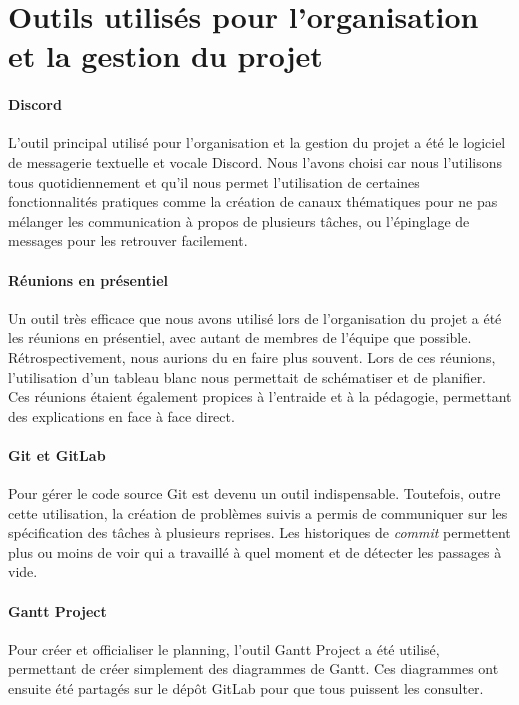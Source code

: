 \section{Outils utilisés pour l'organisation et la gestion du projet}

\paragraph{Discord} L'outil principal utilisé pour
l'organisation et la gestion du projet a été le logiciel de
messagerie textuelle et vocale Discord. Nous l'avons choisi
car nous l'utilisons tous quotidiennement et qu'il nous
permet l'utilisation de certaines fonctionnalités pratiques
comme la création de canaux thématiques pour ne pas mélanger
les communication à propos de plusieurs tâches, ou l'épinglage
de messages pour les retrouver facilement.

\paragraph{Réunions en présentiel} Un outil très efficace que
nous avons utilisé lors de l'organisation du projet a été les
réunions en présentiel, avec autant de membres de l'équipe que
possible. Rétrospectivement, nous aurions du en faire plus
souvent. Lors de ces réunions, l'utilisation d'un tableau
blanc nous permettait de schématiser et de planifier. Ces
réunions étaient également propices à l'entraide et à la
pédagogie, permettant des explications en face à face direct.

\paragraph{Git et GitLab} Pour gérer le code source Git est
devenu un outil indispensable. Toutefois, outre cette
utilisation, la création de problèmes suivis a permis
de communiquer sur les spécification des tâches à plusieurs
reprises. Les historiques de \textit{commit} permettent plus
ou moins de voir qui a travaillé à quel moment et de détecter
les passages à vide.

\paragraph{Gantt Project} Pour créer et officialiser le
planning, l'outil Gantt Project a été utilisé, permettant de
créer simplement des diagrammes de Gantt. Ces diagrammes ont ensuite été partagés sur le dépôt GitLab pour que tous puissent les consulter.

